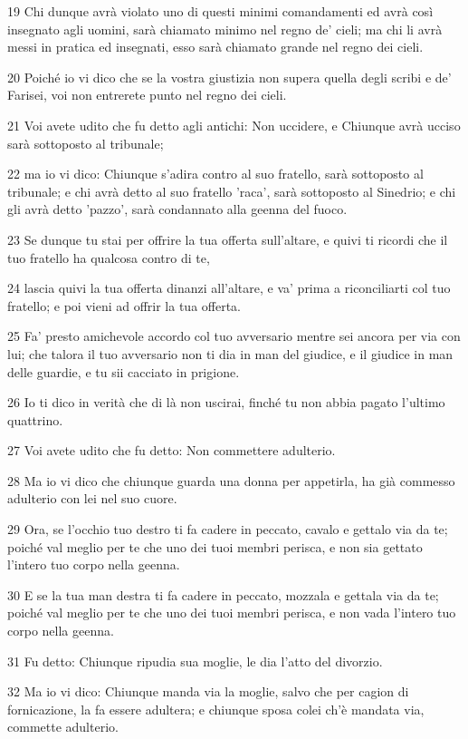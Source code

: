 \par 19 Chi dunque avrà violato uno di questi minimi comandamenti ed avrà così insegnato agli uomini, sarà chiamato minimo nel regno de' cieli; ma chi li avrà messi in pratica ed insegnati, esso sarà chiamato grande nel regno dei cieli.
\par 20 Poiché io vi dico che se la vostra giustizia non supera quella degli scribi e de' Farisei, voi non entrerete punto nel regno dei cieli.
\par 21 Voi avete udito che fu detto agli antichi: Non uccidere, e Chiunque avrà ucciso sarà sottoposto al tribunale;
\par 22 ma io vi dico: Chiunque s'adira contro al suo fratello, sarà sottoposto al tribunale; e chi avrà detto al suo fratello 'raca', sarà sottoposto al Sinedrio; e chi gli avrà detto 'pazzo', sarà condannato alla geenna del fuoco.
\par 23 Se dunque tu stai per offrire la tua offerta sull'altare, e quivi ti ricordi che il tuo fratello ha qualcosa contro di te,
\par 24 lascia quivi la tua offerta dinanzi all'altare, e va' prima a riconciliarti col tuo fratello; e poi vieni ad offrir la tua offerta.
\par 25 Fa' presto amichevole accordo col tuo avversario mentre sei ancora per via con lui; che talora il tuo avversario non ti dia in man del giudice, e il giudice in man delle guardie, e tu sii cacciato in prigione.
\par 26 Io ti dico in verità che di là non uscirai, finché tu non abbia pagato l'ultimo quattrino.
\par 27 Voi avete udito che fu detto: Non commettere adulterio.
\par 28 Ma io vi dico che chiunque guarda una donna per appetirla, ha già commesso adulterio con lei nel suo cuore.
\par 29 Ora, se l'occhio tuo destro ti fa cadere in peccato, cavalo e gettalo via da te; poiché val meglio per te che uno dei tuoi membri perisca, e non sia gettato l'intero tuo corpo nella geenna.
\par 30 E se la tua man destra ti fa cadere in peccato, mozzala e gettala via da te; poiché val meglio per te che uno dei tuoi membri perisca, e non vada l'intero tuo corpo nella geenna.
\par 31 Fu detto: Chiunque ripudia sua moglie, le dia l'atto del divorzio.
\par 32 Ma io vi dico: Chiunque manda via la moglie, salvo che per cagion di fornicazione, la fa essere adultera; e chiunque sposa colei ch'è mandata via, commette adulterio.
